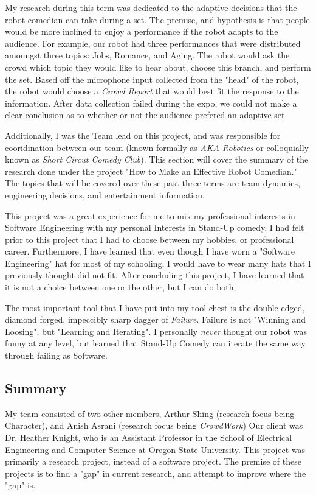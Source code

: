 \documentclass[onecolumn, draftclsnofoot,10pt, compsoc]{IEEEtran}
\begin{document}
	My research during this term was dedicated to the adaptive decisions that the robot comedian can take during a set.
	The premise, and hypothesis is that people would be more inclined to enjoy a performance if the robot adapts to the audience.
	For example, our robot had three performances that were distributed amoungst three topics: Jobs, Romance, and Aging.
	The robot would ask the crowd which topic they would like to hear about, choose this branch, and perform the set.
	Based off the microphone input collected from the "head" of the robot, the robot would choose a \textit{Crowd Report} that would best fit the response to the information.
	After data collection failed during the expo, we could not make a clear conclusion as to whether or not the audience prefered an adaptive set.

	Additionally, I was the Team lead on this project, and was responsible for cooridination between our team (known formally as \textit{AKA Robotics} or colloquially known as \textit{Short Circut Comedy Club}).
	This section will cover the summary of the research done under the project "How to Make an Effective Robot Comedian."
	The topics that will be covered over these past three terms are team dynamics, engineering decisions, and entertainment information.

	This project was a great experience for me to mix my professional interests in Software Engineering with my personal Interests in Stand-Up comedy.
	I had felt prior to this project that I had to choose between my hobbies, or professional career.
	Furthermore, I have learned that even though I have worn a "Software Engineering" hat for most of my schooling, I would have to wear many hats that I previously thought did not fit.
	After concluding this project, I have learned that it is not a choice between one or the other, but I can do both.

	The most important tool that I have put into my tool chest is the double edged, diamond forged, impeccibly sharp dagger of \textit{Failure}. Failure is not "Winning and Loosing", but "Learning and Iterating".
	I personally \textit{never} thought our robot was funny at any level, but learned that Stand-Up Comedy can iterate the same way through failing as Software.

	
	\subsection{Summary}
		My team consisted of two other members, Arthur Shing (research focus being  Character), and Anish Asrani (research focus being \textit{CrowdWork})
		Our client was Dr. Heather Knight, who is an Assistant Professor in the School of Electrical Engineering and Computer Science at Oregon State University. 
		This project was primarily a research project, instead of a software project. The premise of these projects is to find a "gap" in current research, and attempt to improve where the "gap" is.
\end{document}
